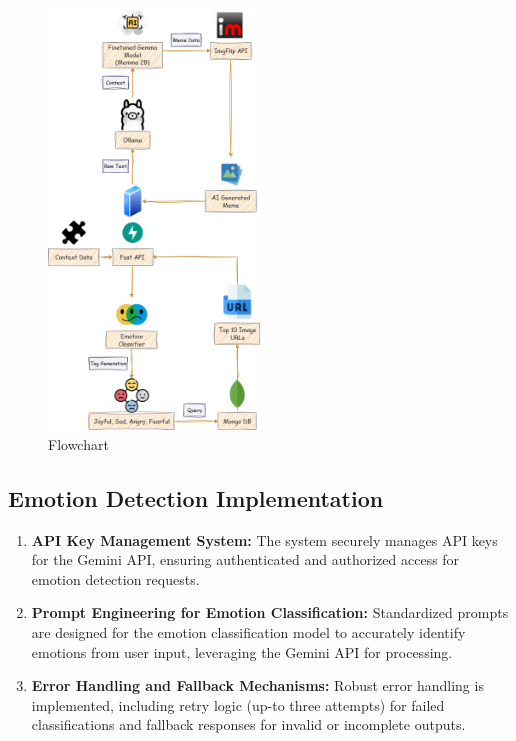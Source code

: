 \documentclass[conference]{IEEEtran}
\begin{document}
\begin{figure}[htbp]
\centering
\includegraphics[width=0.5\textwidth,keepaspectratio]{Assets/Flowchart.png}
\caption{Flowchart}
\label{fig:flowchart}
\end{figure}

\subsection{Emotion Detection Implementation}
\begin{enumerate}
    \item \textbf{API Key Management System:} The system securely manages API keys for the Gemini API, ensuring authenticated and authorized access for emotion detection requests.
    \item \textbf{Prompt Engineering for Emotion Classification:} Standardized prompts are designed for the emotion classification model to accurately identify emotions from user input, leveraging the Gemini API for processing.
    \item \textbf{Error Handling and Fallback Mechanisms:} Robust error handling is implemented, including retry logic (up-to three attempts) for failed classifications and fallback responses for invalid or incomplete outputs.
\end{enumerate}
\end{document}
